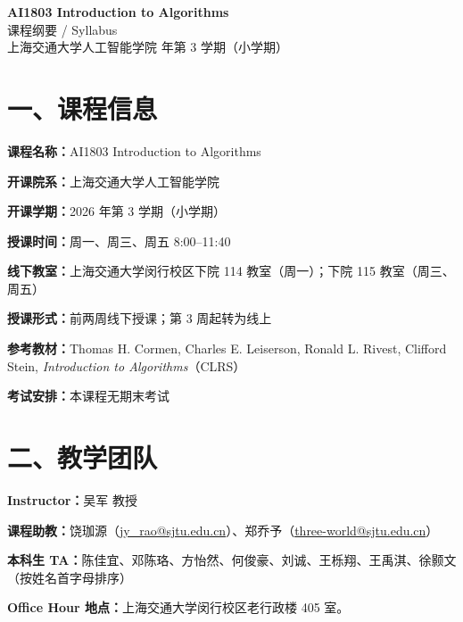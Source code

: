 \documentclass[11pt,a4paper,fontset=none]{ctexart}
\newcommand{\course}{AI1803 Introduction to Algorithms}
\newcommand{\term}{2026 年第 3 学期（小学期）}
\newcommand{\school}{上海交通大学人工智能学院}
\newcommand{\keypoint}[1]{\textbf{\textcolor{emphred}{#1}}}
\newcommand{\info}[2]{\keypoint{#1：}#2\par}
\begin{document}
\begin{center}
  {\LARGE \bfseries \course}\\[0.35em]
  {\large 课程纲要 / Syllabus}\\[0.5em]
  \school \quad \term
\end{center}

\section*{一、课程信息}

\info{课程名称}{AI1803 Introduction to Algorithms}
\info{开课院系}{上海交通大学人工智能学院}
\info{开课学期}{2026 年第 3 学期（小学期）}
\info{授课时间}{周一、周三、周五 8:00--11:40}
\info{线下教室}{上海交通大学闵行校区下院 114 教室（周一）；下院 115 教室（周三、周五）}
\info{授课形式}{前两周线下授课；第 3 周起转为线上}
\info{参考教材}{Thomas H. Cormen, Charles E. Leiserson, Ronald L. Rivest, Clifford Stein, \textit{Introduction to Algorithms}（CLRS）}
\info{考试安排}{本课程无期末考试}

\section*{二、教学团队}

\info{Instructor}{吴军 教授}
\info{课程助教}{饶珈源（\href{mailto:jy_rao@sjtu.edu.cn}{jy\_rao@sjtu.edu.cn}）、郑乔予（\href{mailto:three-world@sjtu.edu.cn}{three-world@sjtu.edu.cn}）}
\info{本科生 TA}{陈佳宜、邓陈珞、方怡然、何俊豪、刘诚、王栎翔、王禹淇、徐颢文（按姓名首字母排序）}

\keypoint{Office Hour 地点：}上海交通大学闵行校区老行政楼 405 室。
\end{document}
